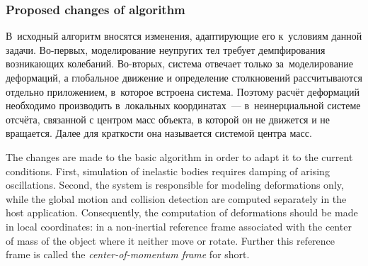 \documentclass[a4paper, 12pt, titlepage]{extarticle}
\begin{document}
      \subsubsection{Proposed changes of algorithm}\label{sssec:proposed_changes}

\begin{original}
        В~исходный алгоритм вносятся изменения, адаптирующие его к~условиям данной
        задачи. Во-первых, моделирование неупругих тел требует демпфирования возникающих колебаний.
        Во-вторых, система отвечает только за~моделирование деформаций, а глобальное движение и
        определение столкновений рассчитываются отдельно приложением, в~которое встроена система.
        Поэтому расчёт деформаций необходимо производить в~локальных координатах~---
        в~неинерциальной системе отсчёта, связанной с центром масс объекта, в которой он не
        движется и не вращается. Далее для краткости она называется системой центра масс.
\end{original}

        The changes are made to the basic algorithm in order to adapt it to the current conditions.
        First, simulation of inelastic bodies requires damping of arising oscillations. Second, the
        system is responsible for modeling deformations only, while the global motion and collision
        detection are computed separately in the host application. Consequently, the computation of
        deformations should be made in local coordinates: in a non-inertial reference frame
        associated with the center of mass of the object where it neither move or rotate. Further
        this reference frame is called the \emph{center-of-momentum frame} for short.
\end{document}

